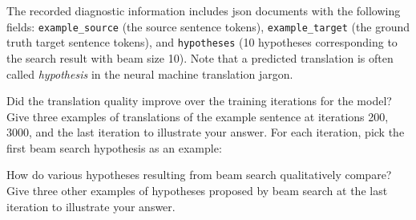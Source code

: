 \begin{parts}
    The recorded diagnostic information includes json documents with the following fields: \texttt{example\_source} (the source sentence tokens), \texttt{example\_target} (the ground truth target sentence tokens), and \texttt{hypotheses} (10 hypotheses corresponding to the search result with beam size 10). Note that a predicted translation is often called \emph{hypothesis} in the neural machine translation jargon.

    \begin{subparts}
        \subpart[2] Did the translation quality improve over the training iterations for the model? Give three examples of translations of the example sentence at iterations 200, 3000, and the last iteration to illustrate your answer. For each iteration, pick the first beam search hypothesis as an example:
        
        
        
        \subpart[2] How do various hypotheses resulting from beam search qualitatively compare? Give three other examples of hypotheses proposed by beam search at the last iteration to illustrate your answer.


\end{subparts}
\end{parts}
